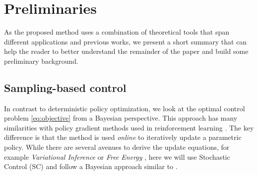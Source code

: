 \section{Preliminaries} \label{sec:theory}

As the proposed method uses a combination of theoretical tools that span different applications and previous works, we present a short summary that can help the reader to better understand the remainder of the paper and build some preliminary background.

\subsection{Sampling-based control}
In contrast to deterministic policy optimization, we look at the optimal control problem \eqref{eq:objective} from a Bayesian perspective. This approach has many similarities with policy gradient methods used in reinforcement learning \cite{williams1992simple}. The key difference is that the method is used \emph{online} to iteratively update a parametric policy. While there are several avenues to derive the update equations, for example \emph{Variational Inference} \cite{lambert_stein_2020} or \emph{Free Energy} \cite{williams_information_2017}, here we will use Stochastic Control (SC) and follow a Bayesian approach similar to \cite{levine2018reinforcement}. 

